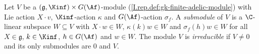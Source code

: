 Let $V$ be a $(\mathfrak g,\Kinf)\times G(\Af)$-module (\cref{I.rep.def:gk-finite-adelic-module}) with Lie action
$X\cdot v$, $\Kinf$-action $\kappa$ and $G(\Af)$-action $\sigma_f$. A \emph{submodule} of $V$ is a $\C$-linear subspace
$W\subseteq V$ with $X\cdot w\in W$, $\kappa(k)w\in W$ and $\sigma_f(h)w\in W$ for all $X\in\mathfrak g$, $k\in\Kinf$,
$h\in G(\Af)$ and $w\in W$. The module $V$ is \emph{irreducible} if $V\neq0$ and its only submodules are $0$ and $V$.
